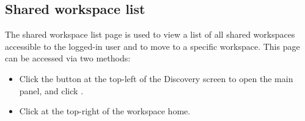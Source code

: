 \documentclass[letterpaper,10pt,english]{sphinxmanual}
\begin{document}
\subsection{Shared workspace list}
\label{\detokenize{discovery/part03/shared_workspace:shared-workspace-list}}\label{\detokenize{discovery/part03/shared_workspace:id2}}
The shared workspace list page is used to view a list of all shared workspaces accessible to the logged-in user and to move to a specific workspace. This page can be accessed via two methods:
\begin{itemize}
\item {} 
Click the  button at the top-left of the Discovery screen to open the main panel, and click .

\item {} 
Click  at the top-right of the workspace home.

\end{itemize}
\end{document}
